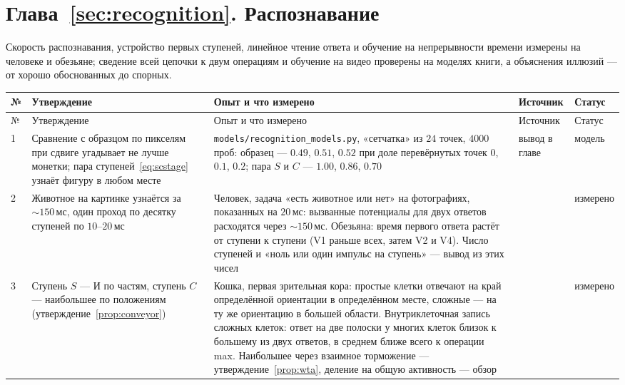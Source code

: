 \section{Глава~\ref{sec:recognition}. Распознавание}

Скорость распознавания, устройство первых ступеней, линейное чтение ответа и обучение на непрерывности времени измерены на человеке и обезьяне; сведение всей цепочки к двум операциям и обучение на видео проверены на моделях книги, а объяснения иллюзий --- от хорошо обоснованных до спорных.

{\footnotesize
\setlength{\tabcolsep}{3pt}\renewcommand{\arraystretch}{1.15}
\begin{longtable}{>{\raggedright}p{0.5cm}>{\raggedright}p{4.0cm}>{\raggedright}p{5.6cm}>{\raggedright}p{2.3cm}>{\raggedright\arraybackslash}p{1.7cm}}
\toprule
№ & Утверждение & Опыт и что измерено & Источник & Статус \\
\midrule\endfirsthead
\toprule
№ & Утверждение & Опыт и что измерено & Источник & Статус \\
\midrule\endhead
1 & Сравнение с образцом по пикселям при сдвиге угадывает не лучше монетки; пара ступеней~\eqref{eq:scstage} узнаёт фигуру в любом месте & \texttt{models/\allowbreak recognition\_models.py}, «сетчатка» из $24$ точек, $4000$ проб: образец --- $0.49$, $0.51$, $0.52$ при доле перевёрнутых точек $0$, $0.1$, $0.2$; пара $S$ и $C$ --- $1.00$, $0.86$, $0.70$ & вывод в главе & модель \\
2 & Животное на картинке узнаётся за $\sim150$\,мс, один проход по десятку ступеней по $10$--$20$\,мс & Человек, задача «есть животное или нет» на фотографиях, показанных на $20$\,мс: вызванные потенциалы для двух ответов расходятся через $\sim150$\,мс. Обезьяна: время первого ответа растёт от ступени к ступени (V1 раньше всех, затем V2 и V4). Число ступеней и «ноль или один импульс на ступень» --- вывод из этих чисел & \cite{Thorpe1996,Schmolesky1998} & измерено \\
3 & Ступень $S$ --- И по частям, ступень $C$ --- наибольшее по положениям (утверждение~\ref{prop:conveyor}) & Кошка, первая зрительная кора: простые клетки отвечают на край определённой ориентации в определённом месте, сложные --- на ту же ориентацию в большей области. Внутриклеточная запись сложных клеток: ответ на две полоски у многих клеток близок к большему из двух ответов, в среднем ближе всего к операции max. Наибольшее через взаимное торможение --- утверждение~\ref{prop:wta}, деление на общую активность --- обзор & \cite{HubelWiesel1962,Lampl2004,Carandini2012} & измерено \\

\end{longtable}}
